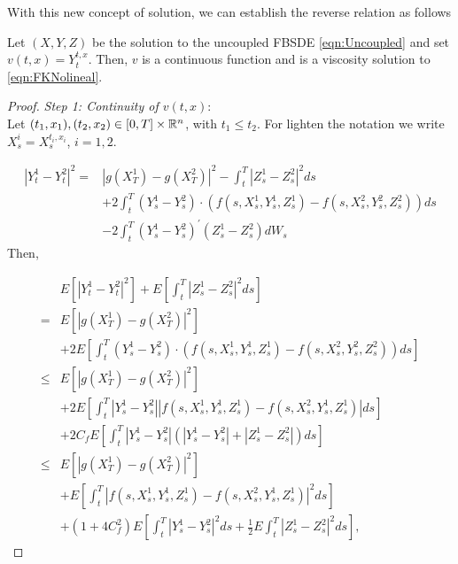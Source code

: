 With this new concept of solution, we can establish the reverse relation as follows
\begin{theorem}
	\label{thm:KFnonReps}
	 Let $(X,Y,Z)$ be the solution to the uncoupled FBSDE \eqref{eqn:Uncoupled} and set $v(t,x)=Y_{t}^{t,x}$. Then, $v$ is a continuous function and is a viscosity solution to \ref{eqn:FKNolineal}.
\end{theorem}
\begin{proof}
	\textit{Step 1: Continuity of $v(t,x)$}: \\
	Let $(t_1,x_1),(t_2,x_2)\in [0,T]\times \mathbb{R}^n$, with $t_1\leq t_2$. For lighten the notation we write $X_{s}^i=X_s^{t_i,x_i}$, $i=1,2$.
	
	\begin{equation}
		\begin{aligned}
			\left|Y_t^1-Y_t^2\right|^2= & \left|g\left(X_T^1\right)-g\left(X_T^2\right)\right|^2-\int_t^T\left|Z_s^1-Z_s^2\right|^2 d s \\
			& +2 \int_t^T\left(Y_s^1-Y_s^2\right) \cdot\left(f\left(s, X_s^1, Y_s^1, Z_s^1\right)-f\left(s, X_s^2, Y_s^2, Z_s^2\right)\right) d s \\
			& -2 \int_t^T\left(Y_s^1-Y_s^2\right)^{\prime}\left(Z_s^1-Z_s^2\right) d W_s
		\end{aligned}
	\end{equation}
Then,

\begin{equation}
	\begin{aligned}
		& E\left[\left|Y_t^1-Y_t^2\right|^2\right]+E\left[\int_t^T\left|Z_s^1-Z_s^2\right|^2 d s\right] \\
		= & E\left[\left|g\left(X_T^1\right)-g\left(X_T^2\right)\right|^2\right] \\
		& +2 E\left[\int_t^T\left(Y_s^1-Y_s^2\right) \cdot\left(f\left(s, X_s^1, Y_s^1, Z_s^1\right)-f\left(s, X_s^2, Y_s^2, Z_s^2\right)\right) d s\right] \\
		\leq & E\left[\left|g\left(X_T^1\right)-g\left(X_T^2\right)\right|^2\right] \\
		& +2 E\left[\int_t^T\left|Y_s^1-Y_s^2\right|\left|f\left(s, X_s^1, Y_s^1, Z_s^1\right)-f\left(s, X_s^2, Y_s^1, Z_s^1\right)\right| d s\right] \\
		& +2 C_f E\left[\int_t^T\left|Y_s^1-Y_s^2\right|\left(\left|Y_s^1-Y_s^2\right|+\left|Z_s^1-Z_s^2\right|\right) d s\right] \\
		\leq & E\left[\left|g\left(X_T^1\right)-g\left(X_T^2\right)\right|^2\right] \\
		& +E\left[\int_t^T\left|f\left(s, X_s^1, Y_s^1, Z_s^1\right)-f\left(s, X_s^2, Y_s^1, Z_s^1\right)\right|^2 d s\right] \\
		& +\left(1+4 C_f^2\right) E\left[\int_t^T\left|Y_s^1-Y_s^2\right|^2 d s+\frac{1}{2} E \int_t^T\left|Z_s^1-Z_s^2\right|^2 d s\right],
	\end{aligned}
\end{equation}


\end{proof}
